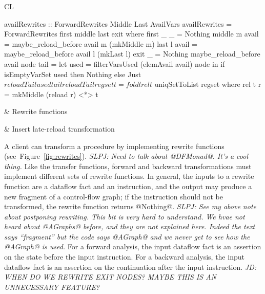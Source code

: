 \documentclass[blockstyle,preprint,nocopyrightspace]{sigplanconf}
\newcommand{\authornote}[1]{{\em #1}}
\newcommand{\simon}[1]{\authornote{SLPJ: #1}}
\newcommand{\john}[1]{\authornote{JD: #1}}
\newcommand\figref[1]{Figure~\ref{fig:#1}}
\newcommand\figlabel[1]{\label{fig:#1}}
\begin{document}
\begin{figure*}
\begin{tabular}{CL}
\T\begin{code}
availRewrites :: ForwardRewrites Middle Last AvailVars
availRewrites = ForwardRewrites first middle last exit
  where first _ _ = Nothing
        middle m avail = maybe_reload_before avail m (mkMiddle m)
        last   l avail = maybe_reload_before avail l (mkLast l)
        exit _ = Nothing
        maybe_reload_before avail node tail =
            let used = filterVarsUsed (elemAvail avail) node
            in  if isEmptyVarSet used then Nothing
                else Just $ reloadTail used tail
        reloadTail regset t = foldl rel t $ uniqSetToList regset
          where rel t r = mkMiddle (reload r) <*> t
\end{code}\B
& Rewrite \mbox{functions}\\
\hline

\T{}%
& Insert \mbox{late-reload} \mbox{transformation}\\
\end{tabular}
\caption{Late-reload insertion, which relies on the analysis of \figref{avail}}
\figlabel{avail-rewrites}
\end{figure*}


A client can transform a procedure by implementing
rewrite functions (see~\figref{rewrites}).
%
\simon{Need to talk about @DFMonad@.  It's a cool thing.}
%
%
Like the transfer functions, forward and backward transformations
must implement different sets of rewrite functions.
In general, the inputs to a rewrite function are a dataflow fact and an instruction,
and the output may produce a new fragment of a control-flow graph;
if the instruction should not be transformed, the rewrite function
returns @Nothing@. \simon{See my above note about postponing rewriting.
This bit is very hard to understand.  We hvae not heard about @AGraphs@ before,
and they are not explained here.  Indeed the text says ``fragment'' but the code
says @AGraph@ and we never get to see how the @AGraph@ is used.}
For a forward analysis, the input dataflow fact is an assertion
on the state before the input instruction.
For a backward analysis, the input dataflow fact is an assertion
on the continuation after the input instruction.
\john{WHEN DO WE REWRITE EXIT NODES? MAYBE THIS IS AN UNNECESSARY FEATURE?}
\end{document}

